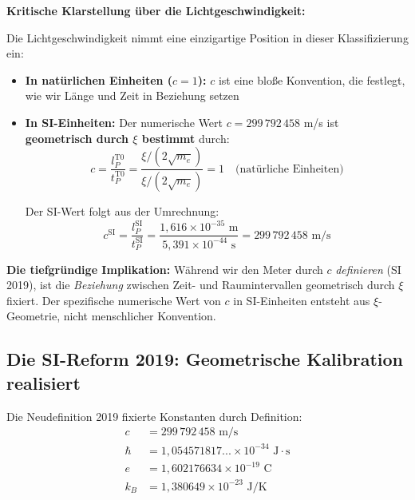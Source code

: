 \documentclass[12pt,a4paper]{article}
\begin{document}
\begin{warning}
\textbf{Kritische Klarstellung {\"u}ber die Lichtgeschwindigkeit:}

Die Lichtgeschwindigkeit nimmt eine einzigartige Position in dieser Klassifizierung ein:

\begin{itemize}
\item \textbf{In nat{\"u}rlichen Einheiten ($c = 1$):} $c$ ist eine blo{\ss}e Konvention, die festlegt, wie wir L{\"a}nge und Zeit in Beziehung setzen

\item \textbf{In SI-Einheiten:} Der numerische Wert $c = 299\,792\,458$ m/s ist \textbf{geometrisch durch $\xi$ bestimmt} durch:
\begin{equation}
c = \frac{l_P^{\text{T0}}}{t_P^{\text{T0}}} = \frac{\xi/(2\sqrt{m_e})}{\xi/(2\sqrt{m_e})} = 1 \quad \text{(nat{\"u}rliche Einheiten)}
\end{equation}

Der SI-Wert folgt aus der Umrechnung:
\begin{equation}
c^{\text{SI}} = \frac{l_P^{\text{SI}}}{t_P^{\text{SI}}} = \frac{1{,}616 \times 10^{-35} \text{ m}}{5{,}391 \times 10^{-44} \text{ s}} = 299\,792\,458 \text{ m/s}
\end{equation}
\end{itemize}

\textbf{Die tiefgr{\"u}ndige Implikation:} W{\"a}hrend wir den Meter durch $c$ \emph{definieren} (SI 2019), ist die \emph{Beziehung} zwischen Zeit- und Raumintervallen geometrisch durch $\xi$ fixiert. Der spezifische numerische Wert von $c$ in SI-Einheiten entsteht aus $\xi$-Geometrie, nicht menschlicher Konvention.
\end{warning}

\subsection{Die SI-Reform 2019: Geometrische Kalibration realisiert}

Die Neudefinition 2019 fixierte Konstanten durch Definition:
\begin{align}
c &= 299\,792\,458 \text{ m/s} \\
\hbar &= 1{,}054571817... \times 10^{-34} \text{ J}\cdot\text{s} \\
e &= 1{,}602176634 \times 10^{-19} \text{ C} \\
k_B &= 1{,}380649 \times 10^{-23} \text{ J/K}
\end{align}
\end{document}
